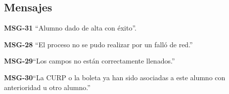 \subsection{Mensajes}

\begin{Citemize}
    \item {\bf MSG-31} ``Alumno dado de alta con éxito''.
    \item {\bf MSG-28}  ``El proceso no se pudo realizar por un falló de red.''
    \item {\bf MSG-29}{``Los campos no están correctamente llenados.''}
    \item {\bf MSG-30}{``La CURP o la boleta ya han sido asociadas a este alumno con anterioridad u otro alumno.''}
\end{Citemize}
